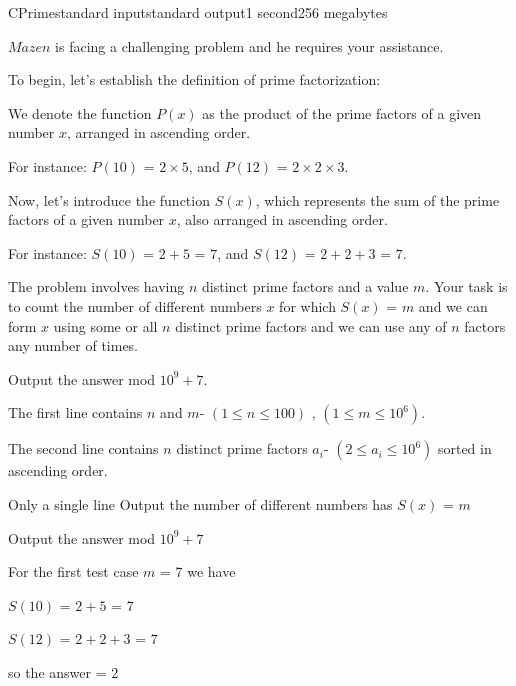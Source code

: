 \begin{problem}{CPrime}{standard input}{standard output}{1 second}{256 megabytes}

$Mazen$ is facing a challenging problem and he requires your assistance.

To begin, let's establish the definition of prime factorization:

We denote the function $P(x)$ as the product of the prime factors of a given number $x$, arranged in ascending order.

For instance:
$P(10)$ = $2 \times 5$, and
$P(12)$ = $2 \times 2 \times 3$.

Now, let's introduce the function $S(x)$, which represents the sum of the prime factors of a given number $x$, also arranged in ascending order.

For instance:
$S(10)$ = $2 + 5$ = $7$, and
$S(12)$ = $2 + 2 + 3$ = $7$.

The problem involves having $n$ distinct prime factors and a value $m$. Your task is to count the number of different numbers $x$ for which $S(x)$ = $m$ and we can form $x$ using some or all $n$ distinct prime factors and we can use any of $n$ factors any number of times.

Output the answer mod $10^9 + 7$.

\InputFile
The first line contains $n$ and $m$- $(1 \le n \le 100)$ , $(1 \le m \le 10^6)$.

The second line contains $n$ distinct prime factors $a_i$- $(2 \le a_i \le 10^6)$
sorted in ascending order.


\OutputFile
Only a single line Output the number of different numbers has $S(x)$ = $m$ 

Output the answer mod $10^9 + 7$

\Examples

\begin{example}
%
%
\end{example}

\Note
For the first test case $m$ = 7
we have 

$S(10)$ = $2 + 5$ = $7$

$S(12)$ = $2 + 2 + 3$ = $7$

so the answer = $2$

\end{problem}

